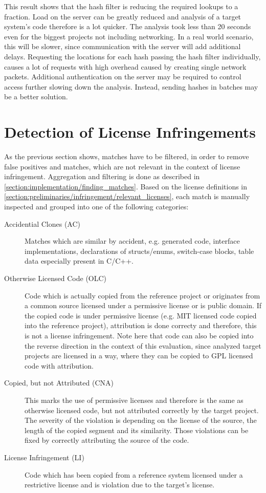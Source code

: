 This result shows that the hash filter is reducing the required lookups to a fraction.
Load on the server can be greatly reduced and analysis of a target system's code therefore is a lot quicker.
The analysis took less than 20 seconds even for the biggest projects not including networking.
In a real world scenario, this will be slower, since communication with the server will add additional delays.
Requesting the locations for each hash passing the hash filter individually, causes a lot of requests with high overhead caused by creating single network packets.
Additional authentication on the server may be required to control access further slowing down the analysis.
Instead, sending hashes in batches may be a better solution.

\newpage
\section{Detection of License Infringements}\label{section:evaluation/detecting_infringements}
As the previous section shows, matches have to be filtered, in order to remove false positives and matches, which are not relevant in the context of license infringement.
Aggregation and filtering is done as described in \autoref{section:implementation/finding_matches}.
Based on the license definitions in \autoref{section:preliminaries/infringement/relevant_licenses}, each match is manually inspected and grouped into one of the following categories:
\begin{description}
	\item [Accidential Clones (AC)]
		Matches which are similar by \glqq accident\grqq, e.g. generated code, interface implementations, declarations of structs/enums, switch-case blocks, table data especially present in C/C++.
	\item[Otherwise Licensed Code (OLC)]
		Code which is actually copied from the reference project or originates from a common source licensed under a permissive license or is public domain.
		If the copied code is under permissive license (e.g. MIT licensed code copied into the reference project), attribution is done correcty and therefore, this is not a license infringement.
		Note here that code can also be copied into the reverse direction in the context of this evaluation, since analyzed target projects are licensed in a way, where they can be copied to GPL licensed code with attribution.
	\item[Copied, but not Attributed (CNA)]
		This marks the use of permissive licenses and therefore is the same as otherwise licensed code, but not attributed correctly by the target project.
		The severity of the violation is depending on the license of the source, the length of the copied segment and its similarity.
		Those violations can be fixed by correctly attributing the source of the code.
	\item[License Infringement (LI)]
		Code which has been copied from a reference system licensed under a restrictive license and is violation due to the target's license.
\end{description}

